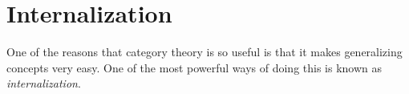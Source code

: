 \documentclass[a4paper,10pt]{scrreprt}
\newcommand{\Hom}{\mathrm{Hom}}
\theoremstyle{definition}
\newtheorem{definition}{Definition}[section]
\theoremstyle{plain}
\theoremstyle{remark}
\newtheorem{notation}{Notation}[section]
\begin{document}
%
%

\section{Internalization}
One of the reasons that category theory is so useful is that it makes generalizing concepts very easy. One of the most powerful ways of doing this is known as \emph{internalization}.
\end{document}
